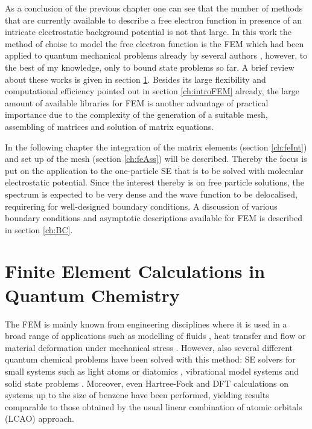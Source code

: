 \label{ch:fem}
As a conclusion of the previous chapter one can see that the number of methods that are currently available to describe a free electron function in presence of an intricate electrostatic background potential is not that large.
In this work the method of choise to model the free electron function is the FEM which had been applied to quantum mechanical problems already by several authors \cite{fem_hydro, vib_fem, fe_hf, fe_dft1}, however, to the best of my knowledge, only to bound state problems so far.
A brief review about these works is given in section \ref{ch:feQM}.
Besides its large flexibility and computational efficiency pointed out in section \ref{ch:introFEM} already, the large amount of available libraries for FEM \cite{libmesh,dealII,freefem, hermes,oofem} is another advantage of practical importance due to the complexity of the generation of a suitable mesh, assembling of matrices and solution of matrix equations.

In the following chapter the integration of the matrix elements (section \ref{ch:feInt}) and set up of the mesh (section \ref{ch:feAss}) will be described.
Thereby the focus is put on the application to the one-particle SE that is to be solved with molecular electrostatic potential.
Since the interest thereby is on free particle solutions, the spectrum is expected to be very dense and the wave function to be delocalised, requirering for well-designed boundary conditions.
A discussion of various boundary conditions and asymptotic descriptions available for FEM is described in section \ref{ch:BC}.

\section{Finite Element Calculations in Quantum Chemistry}
\label{ch:feQM}
The FEM is mainly known from engineering disciplines where it is used in a broad range of applications such as modelling of fluids \cite{fluid1,fluid2}, heat transfer and flow \cite{heat1, heat2,heat3} or material deformation under mechanical stress \cite{deform1, deform2}.
However, also several different quantum chemical problems have been solved with this method: SE solvers for small systems such as light atoms \cite{fem_hydro,fem_He,fem_He1, fem_h1, LiGS_fem} or diatomics \cite{fem_H_refine}, vibrational model systems \cite{vib_fem} and solid state problems \cite{fem_crystal, fem_crystal1}.
Moreover, even Hartree-Fock \cite{fe_hf} and DFT calculations on systems up to the size of benzene \cite{fe_dft1, fe_dft2, fe_dft3} have been performed, yielding results comparable to those obtained by the usual linear combination of atomic orbitals (LCAO) approach.

